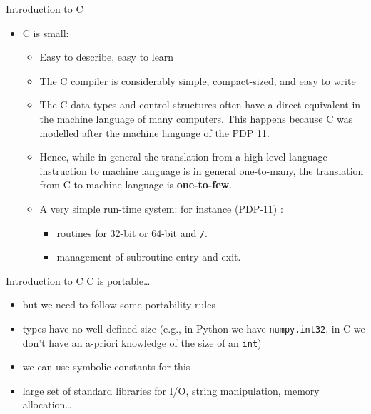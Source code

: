 \begin{frame}[fragile]{Introduction to C}
\begin{itemize}
\item C is small:
  \begin{itemize}
  \item Easy to describe, easy to learn
  \item The C compiler is considerably simple, compact-sized,
        and easy to write
\item The C data types and control structures often have
      a direct equivalent in the machine language of many
      computers. This happens because C was modelled after
      the machine language of the PDP 11. 
\item Hence, while in general the translation from a
      high level language instruction to machine language 
      is in general one-to-many, the translation from C
      to machine language is \textbf{one-to-few}.
\item A very simple run-time system: for instance (PDP-11)
         :
   \begin{itemize}\item routines for 32-bit or 64-bit {\tt *} and {\tt /}.
      \item management of subroutine entry and exit.\end{itemize}
   \end{itemize}
\end{itemize}
\end{frame}

\begin{frame}[fragile]{Introduction to C}
C is portable\ldots

  \begin{itemize}
  \item but we need to follow some portability rules
  \item types have no well-defined size (e.g., in Python we have 
  	\texttt{numpy.int32}, in C we don't have an a-priori knowledge
	of the size of an \texttt{int})
  \item we can use symbolic constants for this
  \item large set of standard libraries for I/O, string manipulation,
  	memory allocation\ldots
  \end{itemize}

\end{frame}


